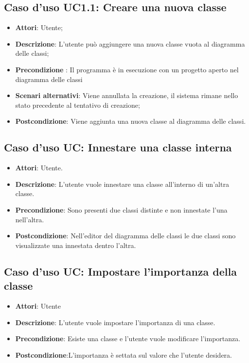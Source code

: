 \documentclass[../AnalisiDeiRequisiti.tex]{subfiles}
\begin{document}
	\subsection{Caso d'uso UC1.1: Creare una nuova classe}
	\begin{itemize}
		\item \textbf{Attori}: Utente;
		
		\item \textbf{Descrizione}: L'utente può aggiungere una nuova classe vuota al diagramma delle classi;
		
		\item \textbf{Precondizione }: Il programma è in esecuzione con un progetto aperto nel diagramma delle classi
		
		
		\item \textbf{Scenari alternativi}: Viene annullata la creazione, il sistema
		rimane nello stato precedente al tentativo di creazione;
		
		\item \textbf{Postcondizione}: Viene aggiunta una nuova classe al diagramma delle classi.
	\end{itemize}
	
		\subsection{Caso d'uso UC: Innestare una classe interna}
		\begin{itemize}
			\item\textbf{Attori}: Utente.
			\item\textbf{Descrizione}: L'utente vuole innestare una classe all'interno di un'altra classe.
			\item\textbf{Precondizione}: Sono presenti due classi distinte e non innestate l'una nell'altra.
			\item\textbf{Postcondizione}: Nell'editor del diagramma delle classi le due classi sono visualizzate una innestata dentro l'altra.	
		\end{itemize}
		
		\subsection{Caso d'uso UC: Impostare l'importanza della classe}
		\begin{itemize}
			\item\textbf{Attori}: Utente
			\item\textbf{Descrizione}: L'utente vuole impostare l'importanza di una classe.
			\item\textbf{Precondizione}: Esiste una classe e l'utente vuole modificare l'importanza.
			\item\textbf{Postcondizione}:L'importanza è settata sul valore che l'utente desidera.
		\end{itemize}
		
\end{document}

